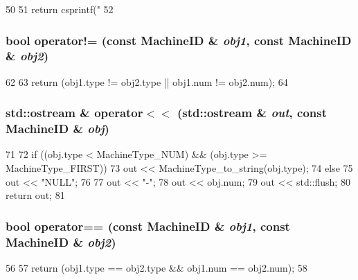 \begin{DoxyCode}
50 {
51     return csprintf("%
52 }
\end{DoxyCode}
\hypertarget{MachineID_8hh_a7342041807981c499dd80e1e1761428b}{
\subsubsection[{operator!=}]{\setlength{\rightskip}{0pt plus 5cm}bool operator!= (const {\bf MachineID} \& {\em obj1}, \/  const {\bf MachineID} \& {\em obj2})}}
\label{MachineID_8hh_a7342041807981c499dd80e1e1761428b}



\begin{DoxyCode}
62 {
63     return (obj1.type != obj2.type || obj1.num != obj2.num);
64 }
\end{DoxyCode}
\hypertarget{MachineID_8hh_a0f55f3e75651da1045254309a1ed6cad}{
\subsubsection[{operator$<$$<$}]{\setlength{\rightskip}{0pt plus 5cm}std::ostream \& operator$<$$<$ (std::ostream \& {\em out}, \/  const {\bf MachineID} \& {\em obj})}}
\label{MachineID_8hh_a0f55f3e75651da1045254309a1ed6cad}



\begin{DoxyCode}
71 {
72     if ((obj.type < MachineType_NUM) && (obj.type >= MachineType_FIRST)) {
73         out << MachineType_to_string(obj.type);
74     } else {
75         out << "NULL";
76     }
77     out << "-";
78     out << obj.num;
79     out << std::flush;
80     return out;
81 }
\end{DoxyCode}
\hypertarget{MachineID_8hh_afc2ad3307acf1a17f2c41b83b0bd0413}{
\subsubsection[{operator==}]{\setlength{\rightskip}{0pt plus 5cm}bool operator== (const {\bf MachineID} \& {\em obj1}, \/  const {\bf MachineID} \& {\em obj2})}}
\label{MachineID_8hh_afc2ad3307acf1a17f2c41b83b0bd0413}



\begin{DoxyCode}
56 {
57     return (obj1.type == obj2.type && obj1.num == obj2.num);
58 }
\end{DoxyCode}
